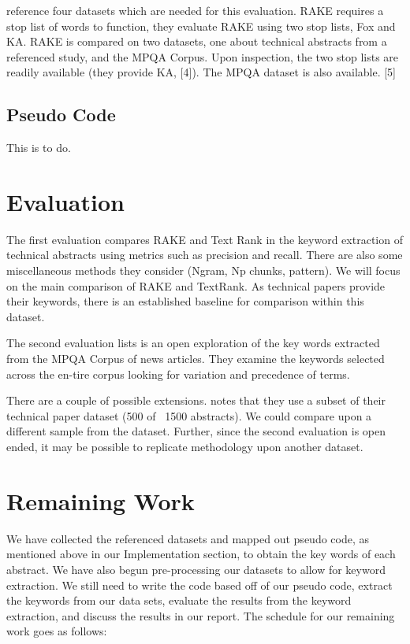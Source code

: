 \documentclass[11pt,a4paper]{article}
\begin{document}
\citet{1} reference four datasets which are needed for this evaluation. RAKE requires a stop list of words to function, they evaluate RAKE using two stop lists, Fox and KA. RAKE is compared on two datasets, one about technical abstracts from a referenced study, and the MPQA Corpus. Upon inspection, the two stop lists are readily available (they provide KA, [4]). The MPQA dataset is also available. [5]

\subsection {Pseudo Code}
This is to do.

\section{Evaluation}

The first evaluation compares RAKE and Text Rank in the keyword extraction of technical abstracts using metrics such as precision and recall. There are also some miscellaneous methods they consider (Ngram, Np chunks, pattern). We will focus on the main comparison of RAKE and TextRank. As technical papers provide their keywords, there is an established baseline for comparison within this dataset.

The second evaluation \citet{1} lists is an open exploration of the key words extracted from the MPQA Corpus of news articles. They examine the keywords selected across the en-tire corpus looking for variation and precedence of terms.   

There are a couple of possible extensions. \citet{1} notes that they use a subset of their technical paper dataset (500 of ~1500 abstracts).  We could compare upon a different sample from the dataset. Further, since the second evaluation is open ended, it may be possible to replicate  methodology upon another dataset.


\section{Remaining Work}

We have collected the referenced datasets and mapped out pseudo code, as mentioned above in our Implementation section, to obtain the key words of each abstract. We have also begun pre-processing our datasets to allow for keyword extraction. We still need to write the code based off of our pseudo code, extract the keywords from our data sets, evaluate the results from the keyword extraction, and discuss the results in our report. The schedule for our remaining work goes as follows:
\end{document}
